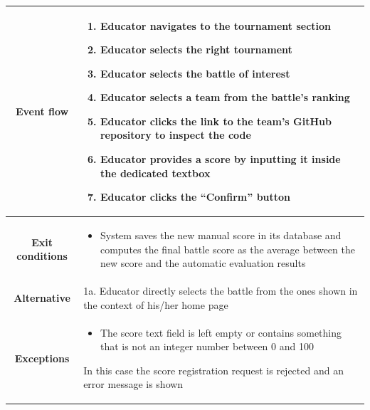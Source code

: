 \begin{center}
\begin{tabular}{ |c|m{10cm}| }
        \hline
        \textbf{Event flow} &
        \begin{enumerate}
            \item Educator navigates to the tournament section
            \item Educator selects the right tournament
            \item Educator selects the battle of interest
            \item Educator selects a team from the battle’s ranking
            \item Educator clicks the link to the team’s GitHub repository to inspect the code
            \item Educator provides a score by inputting it inside the dedicated textbox
            \item Educator clicks the “Confirm” button
        \end{enumerate} \\
        \hline
        \textbf{Exit conditions} &
        \begin{itemize}
            \item System saves the new manual score in its database and computes the final battle score as the average between the new score and the automatic evaluation results
        \end{itemize} \\
        \hline
        \textbf{Alternative} & 
            1a. Educator directly selects the battle from the ones shown in the context of his/her home page \\
        \hline
        \textbf{Exceptions} & 
        \begin{itemize}
            \item The score text field is left empty or contains something that is not an integer number between 0 and 100
        \end{itemize} 
        In this case the score registration request is rejected and an error message is shown \\
        \hline
    \end{tabular}
    \begin{figure}[H]
        \hspace{10px}

\end{figure}
\end{center}
